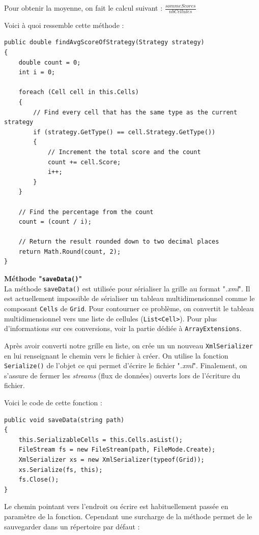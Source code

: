 \documentclass[a4paper]{article}
\begin{document}
Pour obtenir la moyenne, on fait le calcul suivant : $\frac{sommeScores}{nbCellules}$

Voici à quoi ressemble cette méthode :
\begin{lstlisting}
public double findAvgScoreOfStrategy(Strategy strategy)
{
    double count = 0;
    int i = 0;

    foreach (Cell cell in this.Cells)
    {
        // Find every cell that has the same type as the current strategy
        if (strategy.GetType() == cell.Strategy.GetType())
        {
            // Increment the total score and the count
            count += cell.Score;
            i++;
        }
    }

    // Find the percentage from the count
    count = (count / i);

    // Return the result rounded down to two decimal places
    return Math.Round(count, 2);
}
\end{lstlisting}

\textbf{Méthode "\texttt{saveData()}"}\\
La méthode \texttt{saveData()} est utilisée pour sérialiser la grille au format "\textit{.xml}". Il est actuellement impossible de sérialiser un tableau multidimensionnel comme le composant \texttt{Cells} de \texttt{Grid}. Pour contourner ce problème, on convertit le tableau multidimensionnel vers une liste de cellules (\texttt{List<Cell>}). Pour plus d'informations sur ces conversions, voir la partie dédiée à \texttt{ArrayExtensions}.

Après avoir converti notre grille en liste, on crée un un nouveau \texttt{XmlSerializer} en lui renseignant le chemin vers le fichier à créer. On utilise la fonction \texttt{Serialize()} de l'objet ce qui permet d'écrire le fichier "\textit{.xml}". Finalement, on s'assure de fermer les \textit{streams} (flux de données) ouverts lors de l'écriture du fichier. 

Voici le code de cette fonction :
\begin{lstlisting}
public void saveData(string path)
{
    this.SerializableCells = this.Cells.asList();
    FileStream fs = new FileStream(path, FileMode.Create);
    XmlSerializer xs = new XmlSerializer(typeof(Grid));
    xs.Serialize(fs, this);
    fs.Close();
}
\end{lstlisting}

Le chemin pointant vers l'endroit ou écrire est habituellement passée en paramètre de la fonction. Cependant une surcharge de la méthode permet de le sauvegarder dans un répertoire par défaut :
\end{document}
